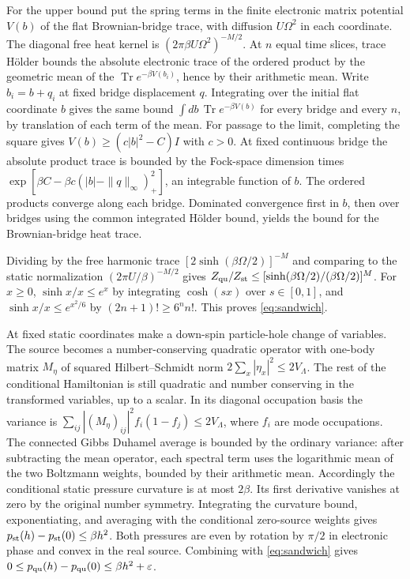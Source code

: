 \documentclass[11pt]{article}
\DeclareMathOperator{\Tr}{Tr}
\begin{document}
For the upper bound put the spring terms in the finite electronic matrix potential $V(b)$ of the flat Brownian-bridge trace, with diffusion $U\Omega^2$ in each coordinate. The diagonal free heat kernel is $(2\pi\beta U\Omega^2)^{-M/2}$. At $n$ equal time slices, trace H\"older bounds the absolute electronic trace of the ordered product by the geometric mean of the $\Tr e^{-\beta V(b_i)}$, hence by their arithmetic mean. Write $b_i=b+q_i$ at fixed bridge displacement $q$. Integrating over the initial flat coordinate $b$ gives the same bound $\int db\,\Tr e^{-\beta V(b)}$ for every bridge and every $n$, by translation of each term of the mean. For passage to the limit, completing the square gives $V(b)\ge(c|b|^2-C)I$ with $c>0$. At fixed continuous bridge the absolute product trace is bounded by the Fock-space dimension times $\exp[\beta C-\beta c(|b|-\|q\|_\infty)_+^2]$, an integrable function of $b$. The ordered products converge along each bridge. Dominated convergence first in $b$, then over bridges using the common integrated H\"older bound, yields the bound for the Brownian-bridge heat trace.

Dividing by the free harmonic trace $[2\sinh(\beta\Omega/2)]^{-M}$ and comparing to the static normalization $(2\pi U/\beta)^{-M/2}$ gives $Z_{\rm qu}/Z_{\rm st}\le[\sinh(\beta\Omega/2)/(\beta\Omega/2)]^M$. For $x\ge0$, $\sinh x/x\le e^x$ by integrating $\cosh(sx)$ over $s\in[0,1]$, and $\sinh x/x\le e^{x^2/6}$ by $(2n+1)!\ge6^n n!$. This proves \eqref{eq:sandwich}.

At fixed static coordinates make a down-spin particle-hole change of variables. The source becomes a number-conserving quadratic operator with one-body matrix $M_\eta$ of squared Hilbert--Schmidt norm $2\sum_x|\eta_x|^2\le2V_\Lambda$. The rest of the conditional Hamiltonian is still quadratic and number conserving in the transformed variables, up to a scalar. In its diagonal occupation basis the variance is $\sum_{ij}|(M_\eta)_{ij}|^2 f_i(1-f_j)\le 2V_\Lambda$, where $f_i$ are mode occupations. The connected Gibbs Duhamel average is bounded by the ordinary variance: after subtracting the mean operator, each spectral term uses the logarithmic mean of the two Boltzmann weights, bounded by their arithmetic mean. Accordingly the conditional static pressure curvature is at most $2\beta$. Its first derivative vanishes at zero by the original number symmetry. Integrating the curvature bound, exponentiating, and averaging with the conditional zero-source weights gives $p_{\rm st}(h)-p_{\rm st}(0)\le\beta h^2$. Both pressures are even by rotation by $\pi/2$ in electronic phase and convex in the real source. Combining with \eqref{eq:sandwich} gives $0\le p_{\rm qu}(h)-p_{\rm qu}(0)\le\beta h^2+\varepsilon$.
\end{document}
